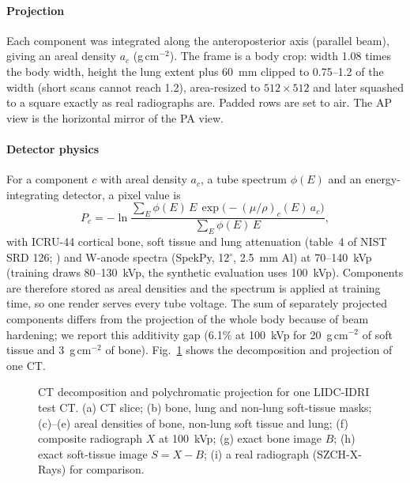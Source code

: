 \paragraph{Projection} Each component was integrated along the anteroposterior axis (parallel beam), giving an areal density $a_c$ (g\,cm$^{-2}$).
The frame is a body crop: width 1.08 times the body width, height the lung extent plus 60~mm clipped to 0.75--1.2 of the width (short scans cannot
reach 1.2), area-resized to $512\times512$ and later squashed to a square exactly as real radiographs are. Padded rows are set to air.
The AP view is the horizontal mirror of the PA view.

\paragraph{Detector physics} For a component $c$ with areal density $a_c$, a tube spectrum $\phi(E)$ and an energy-integrating detector,
a pixel value is
\begin{equation}
P_c=-\ln\frac{\sum_E \phi(E)\,E\,\exp\!\big(-(\mu/\rho)_c(E)\,a_c\big)}{\sum_E\phi(E)\,E},
\label{eq:physics}
\end{equation}
with ICRU-44 \citep{icru1989report44} cortical bone, soft tissue and lung attenuation (table~4 of NIST SRD 126; \citealp{hubbell2004xraymass}) and W-anode spectra (SpekPy, 12$^\circ$, 2.5~mm Al) at
70--140~kVp (training draws 80--130~kVp, the synthetic evaluation uses 100~kVp). Components are therefore stored as areal densities and the
spectrum is applied at training time, so one render serves every tube voltage.
The sum of separately projected components differs from the projection of the whole body because of beam hardening; we report this
additivity gap (6.1\% at 100~kVp for 20~g\,cm$^{-2}$ of soft tissue and 3~g\,cm$^{-2}$ of bone). Fig.~\ref{fig:pipeline} shows the
decomposition and projection of one CT.

\begin{figure}[htbp]
\centering
{}
\caption{CT decomposition and polychromatic projection for one LIDC-IDRI test CT. (a) CT slice; (b) bone, lung and non-lung soft-tissue
masks; (c)--(e) areal densities of bone, non-lung soft tissue and lung; (f) composite radiograph $X$ at 100~kVp; (g) exact bone image $B$;
(h) exact soft-tissue image $S=X-B$; (i) a real radiograph (SZCH-X-Rays) for comparison.}
\label{fig:pipeline}
\end{figure}

